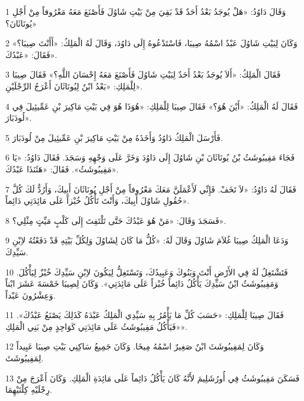 \par 1 وَقَالَ دَاوُدُ: «هَلْ يُوجَدُ بَعْدُ أَحَدٌ قَدْ بَقِيَ مِنْ بَيْتِ شَاوُلَ فَأَصْنَعَ مَعَهُ مَعْرُوفاً مِنْ أَجْلِ يُونَاثَانَ؟»
\par 2 وَكَانَ لِبَيْتِ شَاوُلَ عَبْدٌ اسْمُهُ صِيبَا، فَاسْتَدْعُوهُ إِلَى دَاوُدَ، وَقَالَ لَهُ الْمَلِكُ: «أَأَنْتَ صِيبَا؟» فَقَالَ: «عَبْدُكَ».
\par 3 فَقَالَ الْمَلِكُ: «أَلاَ يُوجَدُ بَعْدُ أَحَدٌ لِبَيْتِ شَاوُلَ فَأَصْنَعَ مَعَهُ إِحْسَانَ اللَّهِ؟» فَقَالَ صِيبَا لِلْمَلِكِ: «بَعْدُ ابْنٌ لِيُونَاثَانَ أَعْرَجُ الرِّجْلَيْنِ».
\par 4 فَقَالَ لَهُ الْمَلِكُ: «أَيْنَ هُوَ؟» فَقَالَ صِيبَا لِلْمَلِكِ: «هُوَذَا هُوَ فِي بَيْتِ مَاكِيرَ بْنِ عَمِّيئِيلَ فِي لُودَبَارَ».
\par 5 فَأَرْسَلَ الْمَلِكُ دَاوُدُ وَأَخَذَهُ مِنْ بَيْتِ مَاكِيرَ بْنِ عَمِّيئِيلَ مِنْ لُودَبَارَ.
\par 6 فَجَاءَ مَفِيبُوشَثُ بْنُ يُونَاثَانَ بْنِ شَاوُلَ إِلَى دَاوُدَ وَخَرَّ عَلَى وَجْهِهِ وَسَجَدَ. فَقَالَ دَاوُدُ: «يَا مَفِيبُوشَثُ». فَقَالَ: «هَئَنَذَا عَبْدُكَ».
\par 7 فَقَالَ لَهُ دَاوُدُ: «لاَ تَخَفْ. فَإِنِّي لَأَعْمَلَنَّ مَعَكَ مَعْرُوفاً مِنْ أَجْلِ يُونَاثَانَ أَبِيكَ، وَأَرُدُّ لَكَ كُلَّ حُقُولِ شَاوُلَ أَبِيكَ، وَأَنْتَ تَأْكُلُ خُبْزاً عَلَى مَائِدَتِي دَائِماً».
\par 8 فَسَجَدَ وَقَالَ: «مَنْ هُوَ عَبْدُكَ حَتَّى تَلْتَفِتَ إِلَى كَلْبٍ مَيِّتٍ مِثْلِي؟».
\par 9 وَدَعَا الْمَلِكُ صِيبَا غُلاَمَ شَاوُلَ وَقَالَ لَهُ: «كُلُّ مَا كَانَ لِشَاوُلَ وَلِكُلِّ بَيْتِهِ قَدْ دَفَعْتُهُ لاِبْنِ سَيِّدِكَ.
\par 10 فَتَشْتَغِلُ لَهُ فِي الأَرْضِ أَنْتَ وَبَنُوكَ وَعَبِيدُكَ، وَتَسْتَغِلُّ لِيَكُونَ لاِبْنِ سَيِّدِكَ خُبْزٌ لِيَأْكُلَ. وَمَفِيبُوشَثُ ابْنُ سَيِّدِكَ يَأْكُلُ دَائِماً خُبْزاً عَلَى مَائِدَتِي». وَكَانَ لِصِيبَا خَمْسَةَ عَشَرَ ابْناً وَعِشْرُونَ عَبْداً.
\par 11 فَقَالَ صِيبَا لِلْمَلِكِ: «حَسَبَ كُلِّ مَا يَأْمُرُ بِهِ سَيِّدِي الْمَلِكُ عَبْدَهُ كَذَلِكَ يَصْنَعُ عَبْدُكَ». «فَيَأْكُلُ مَفِيبُوشَثُ عَلَى مَائِدَتِي كَوَاحِدٍ مِنْ بَنِي الْمَلِكِ».
\par 12 وَكَانَ لِمَفِيبُوشَثَ ابْنٌ صَغِيرٌ اسْمُهُ مِيخَا. وَكَانَ جَمِيعُ سَاكِنِي بَيْتِ صِيبَا عَبِيداً لِمَفِيبُوشَثَ.
\par 13 فَسَكَنَ مَفِيبُوشَثُ فِي أُورُشَلِيمَ لأَنَّهُ كَانَ يَأْكُلُ دَائِماً عَلَى مَائِدَةِ الْمَلِكِ. وَكَانَ أَعْرَجَ مِنْ رِجْلَيْهِ كِلْتَيْهِمَا.

